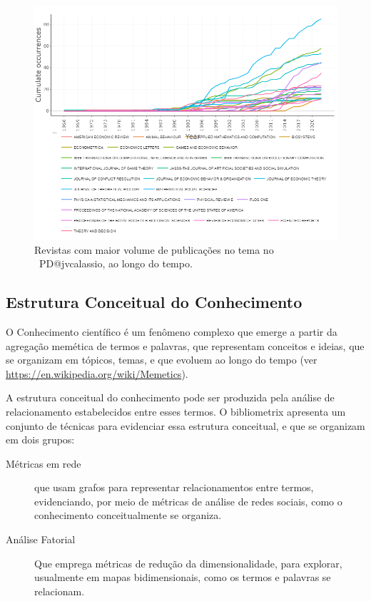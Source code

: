 \begin{figure}
    \centering
    \includegraphics[width=1\textwidth]{exploratory-data-analysis/jvcalassio/PesqBibliogr/PrisonersDilemma/WoS-20221201/Dataset/SourceDynamics-2022-12-03.png}
    \caption{Revistas com maior volume de publicações no tema no  \dataset\ PD@jvcalassio, ao longo do tempo.}
    \label{fig:PD@jvcalassio:Source-Dynamics.png}
\end{figure}

\subsection{Estrutura Conceitual do Conhecimento}

O Conhecimento científico é um fenômeno complexo que emerge a partir da agregação memética de termos e palavras, que representam conceitos e ideias, que se organizam em tópicos, temas, e que evoluem ao longo do tempo (ver \url{https://en.wikipedia.org/wiki/Memetics}).

A estrutura conceitual do conhecimento pode ser produzida pela análise de relacionamento estabelecidos entre esses termos. O bibliometrix apresenta um conjunto de técnicas para evidenciar essa estrutura conceitual, e que se organizam em dois grupos:
\begin{description}
    \item [Métricas em rede] que usam grafos para representar relacionamentos entre termos, evidenciando, por meio de métricas de análise de redes sociais, como o conhecimento conceitualmente se organiza.
    \item [Análise Fatorial] Que emprega métricas de redução da dimensionalidade, para explorar, usualmente em mapas bidimensionais, como os termos e palavras se relacionam. 
\end{description}


